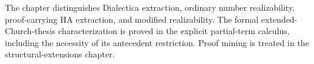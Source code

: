 The chapter distinguishes Dialectica extraction, ordinary number
realizability, proof-carrying HA extraction, and modified realizability.
The formal extended-Church-thesis characterization is proved in the
explicit partial-term calculus, including the necessity of its
antecedent restriction. Proof mining is treated in the
structural-extensions chapter.
